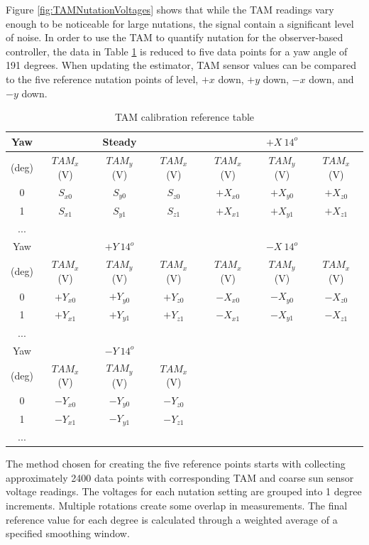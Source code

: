 Figure \ref{fig:TAMNutationVoltages} shows that while the TAM readings vary enough to be noticeable for large nutations, the signal contain a significant level of noise.  In order to use the TAM to quantify nutation for the observer-based controller, the data in Table \ref{tbl:TAMCalibration} is reduced to five data points for a yaw angle of 191 degrees.  When updating the estimator, TAM sensor values can be compared to the five reference nutation points of level, $+x$ down, $+y$ down, $-x$ down, and $-y$ down.

\begin{table}[H]
  \centering
  \begin{tabular}{c|ccc|ccc}
    \hline
    Yaw   & & Steady & & & $+X \ 14^o$ & \\ \hline
    (deg) & $TAM_x$ (V) & $TAM_y$ (V) & $TAM_x$ (V) & $TAM_x$ (V) & $TAM_y$ (V) & $TAM_x$ (V)  \\ \hline
    0 & $S_{x0}$ & $S_{y0}$ & $S_{z0}$ & $+X_{x0}$ & $+X_{y0}$ & $+X_{z0}$ \\ \hline
    1 & $S_{x1}$ & $S_{y1}$ & $S_{z1}$ & $+X_{x1}$ & $+X_{y1}$ & $+X_{z1}$ \\ \hline
    ... & & & & & &  \\ \hline
    Yaw   & & $+Y \ 14^o$ & & & $-X \ 14^o$ & \\ \hline
    (deg) & $TAM_x$ (V) & $TAM_y$ (V) & $TAM_x$ (V) & $TAM_x$ (V) & $TAM_y$ (V) & $TAM_x$ (V)  \\ \hline
    0 & $+Y_{x0}$ & $+Y_{y0}$ & $+Y_{z0}$ & $-X_{x0}$ & $-X_{y0}$ & $-X_{z0}$ \\ \hline
    1 & $+Y_{x1}$ & $+Y_{y1}$ & $+Y_{z1}$ & $-X_{x1}$ & $-X_{y1}$ & $-X_{z1}$ \\ \hline
    ... & & & & & &  \\ \hline
    Yaw   & & $-Y \ 14^o$ & &  \\ \hline
    (deg) & $TAM_x$ (V) & $TAM_y$ (V) & $TAM_x$ (V)  \\ \hline
    0 & $-Y_{x0}$ & $-Y_{y0}$ & $-Y_{z0}$  \\ \hline
    1 & $-Y_{x1}$ & $-Y_{y1}$ & $-Y_{z1}$  \\ \hline
    ... & & & & & &  \\ \hline
  \end{tabular}
  \caption{TAM calibration reference table}
  \label{tbl:TAMCalibration}
\end{table}

The method chosen for creating the five reference points starts with collecting approximately 2400 data points with corresponding TAM and coarse sun sensor voltage readings.  The voltages for each nutation setting are grouped into 1 degree increments.  Multiple rotations create some overlap in measurements.  The final reference value for each degree is calculated through a weighted average of a specified smoothing window.

